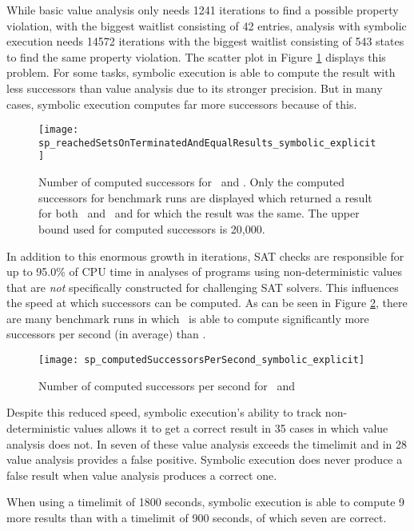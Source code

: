 While basic value analysis only needs 1241 iterations to find a possible property violation, with the biggest waitlist consisting of 42 entries,
analysis with symbolic execution needs 14572 iterations with the biggest waitlist consisting of 543 states to find the same property violation.
The scatter plot in Figure \ref{graph:computedSuccessors} displays this problem.
For some tasks, symbolic execution is able to compute the result with less successors than value analysis due to its stronger precision. But in many cases, symbolic execution computes far more successors because of this.
\begin{figure}[h]
\texttt{[image: sp\_reachedSetsOnTerminatedAndEqualResults\_symbolic\_explicit]}
\caption{Number of computed successors for \ and \symbolicExecutionCPA.
         Only the computed successors for benchmark runs are displayed which returned a result for both \symbolicExecutionCPA\ and \ and for which the result was the same. The upper bound used for computed successors is 20,000.}
\label{graph:computedSuccessors}
\end{figure}
In addition to this enormous growth in iterations, SAT checks are responsible for up to 95.0\% of CPU time in analyses of programs using non-deterministic values that are \emph{not} specifically constructed for challenging SAT solvers.
This influences the speed at which successors can be computed.
As can be seen in Figure \ref{graph:computedSuccessorsPerS}, there are many benchmark runs in which \ is able to compute significantly more successors per second (in average) than \symbolicExecutionCPA.
\begin{figure}[h]
\texttt{[image: sp\_computedSuccessorsPerSecond\_symbolic\_explicit]}
\caption{Number of computed successors per second for \ and \symbolicExecutionCPA}
\label{graph:computedSuccessorsPerS}
\end{figure}

Despite this reduced speed, symbolic execution's ability to track non-deterministic values allows it to get a correct result in 35 cases in which value analysis does not. In seven of these value analysis exceeds the timelimit and in 28 value analysis provides a false positive. Symbolic execution does never produce a false result when value analysis produces a correct one.

When using a timelimit of 1800 seconds, symbolic execution is able to compute 9 more results than with a timelimit of 900 seconds, of which seven are correct.

